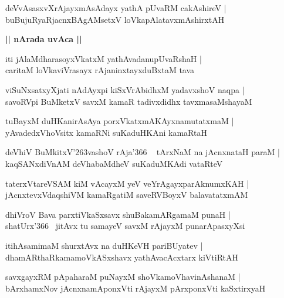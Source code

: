 \documentclass[twoside,12pt,openright]{book}
\def\S{\char'263}
\newcounter{shloka}[chapter]
\def\uvaca#1{\centerline{{\large\textbf{#1}}}}
\begin{document}
\begin{shloka}%
deVvAsasxvXrAjayxmAsAdayx yathA pUvaRM cakAshireV |\\
buBujuRyaRjacnxBAgAMsetxV loVkapAlatavxmAshirxtAH 
\end{shloka}

\uvaca{|| nArada uvAca ||}

\begin{shloka}%
iti jAlaMdharasoyxVkatxM yathAvadanupUvaRshaH |\\
caritaM loVkaviVrasayx rAjaninxtayxduBxtaM tava 
\end{shloka}

\begin{shloka}%
viSuNxsatxyXjati nAdAyxpi kiSxVrAbidhxM yadavxshoV naqpa |\\
savoRVpi BuMketxV savxM kamaR tadivxdidhx tavxmasaMshayaM 
\end{shloka}

\begin{shloka}%
tuBayxM duHKanirAsAya porxVkatxmAKAyxnamutatxmaM |\\
yAvadedxVhoVsitx kamaRNi suKaduHKAni kamaRtaH 
\end{shloka}

\begin{shloka}%
deVhiV BuMkitxV\S vashoV rAja\char'366 ~ tArxNaM na jAcnxnataH paraM |\\
kaqSANxdiVnAM deVhabaMdheV suKaduMKAdi vataRteV 
\end{shloka}

\begin{shloka}%
taterxVtareVSAM kiM vAcayxM yeV veYrAgayxparAknumxKAH |\\
jAcnxtevxVdaqshiVM kamaRgatiM saveRVBoyxV balavatatxmAM 
\end{shloka}

\begin{shloka}%
dhiVroV Bava parxtiVkaSxsavx shuBakamARgamaM punaH |\\
shatUrx\char'366 ~jitAvx tu samayeV savxM rAjayxM punarApasxyXsi 
\end{shloka}

\begin{shloka}%
itihAsamimaM shurxtAvx na duHKeVH pariBUyatev |\\
dhamARthaRkamamoVkASxshavx yathAvacAcxtarx kiVtiRtAH 
\end{shloka}

\begin{shloka}%
savxgayxRM pApaharaM puNayxM shoVkamoVhavinAshanaM |\\
bArxhamxNov jAcnxnamAponxVti rAjayxM pArxponxVti kaSxtirxyaH 
\end{shloka}
\end{document}
